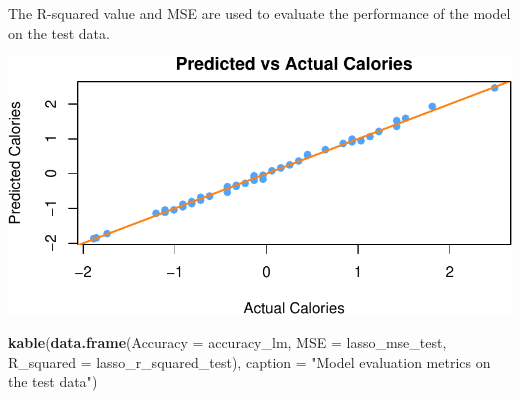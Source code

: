 \documentclass[
]{article}
\newenvironment{Shaded}{\begin{snugshade}}{\end{snugshade}}
\newcommand{\AttributeTok}[1]{\textcolor[rgb]{0.13,0.29,0.53}{#1}}
\newcommand{\DecValTok}[1]{\textcolor[rgb]{0.00,0.00,0.81}{#1}}
\newcommand{\FunctionTok}[1]{\textcolor[rgb]{0.13,0.29,0.53}{\textbf{#1}}}
\newcommand{\NormalTok}[1]{#1}
\newcommand{\OtherTok}[1]{\textcolor[rgb]{0.56,0.35,0.01}{#1}}
\newcommand{\SpecialCharTok}[1]{\textcolor[rgb]{0.81,0.36,0.00}{\textbf{#1}}}
\newcommand{\StringTok}[1]{\textcolor[rgb]{0.31,0.60,0.02}{#1}}
\begin{document}
The R-squared value and MSE are used to evaluate the performance of the
model on the test data.

\begin{Shaded}
\end{Shaded}

\begin{center}\includegraphics{Statistical_Learning_Final_Report_files/figure-latex/accuracy_lm-1} \end{center}

\begin{Shaded}
\begin{Highlighting}[]
\FunctionTok{kable}\NormalTok{(}\FunctionTok{data.frame}\NormalTok{(}\AttributeTok{Accuracy =}\NormalTok{ accuracy\_lm, }\AttributeTok{MSE =}\NormalTok{ lasso\_mse\_test, }
                 \AttributeTok{R\_squared =}\NormalTok{ lasso\_r\_squared\_test),}
      \AttributeTok{caption =} \StringTok{"Model evaluation metrics on the test data"}\NormalTok{)}
\end{Highlighting}
\end{Shaded}
\end{document}
